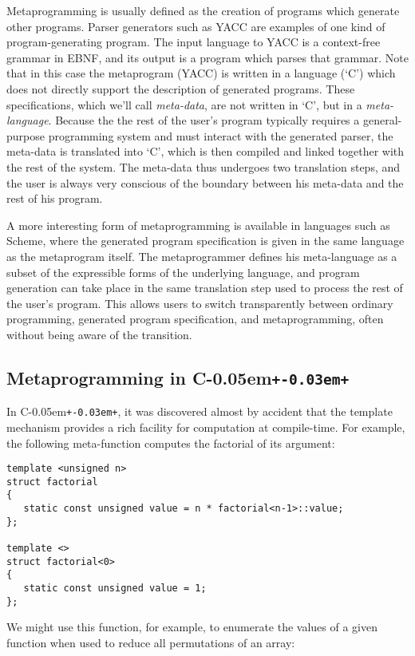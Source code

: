 \documentclass{netobjectdays}
\newcommand{\Cpp}{C\kern-0.05em\texttt{+\kern-0.03em+}}
\begin{document}
Metaprogramming is usually defined as the creation of programs which
generate other programs. Parser generators such as YACC are examples
of one kind of program-generating program. The input language to YACC
is a context-free grammar in EBNF, and its output is a program which
parses that grammar. Note that in this case the metaprogram (YACC) is
written in a language (`C') which does not directly support the
description of generated programs. These specifications, which we'll
call \emph{meta-data}, are not written in `C', but in a
\emph{meta-language}. Because the the rest of the user's program
typically requires a general-purpose programming system and must
interact with the generated parser, the meta-data is translated into
`C', which is then compiled and linked together with the rest of the
system. The meta-data thus undergoes two translation steps, and the
user is always very conscious of the boundary between his meta-data
and the rest of his program.

A more interesting form of metaprogramming is available in languages
such as Scheme, where the generated program specification is given in
the same language as the metaprogram itself. The metaprogrammer
defines his meta-language as a subset of the expressible forms of the
underlying language, and program generation can take place in the same
translation step used to process the rest of the user's program. This
allows users to switch transparently between ordinary programming,
generated program specification, and metaprogramming, often without
being aware of the transition.

\subsection{Metaprogramming in \Cpp}

In \Cpp, it was discovered almost by accident that the template
mechanism provides a rich facility for computation at
compile-time. For example, the following meta-function computes the
factorial of its argument:

{\footnotesize
\begin{verbatim}
template <unsigned n>
struct factorial
{
   static const unsigned value = n * factorial<n-1>::value;
};

template <>
struct factorial<0>
{
   static const unsigned value = 1;
};
\end{verbatim}
}

We might use this function, for example, to enumerate the values of a
given function when used to reduce all permutations of an array:
\end{document}
